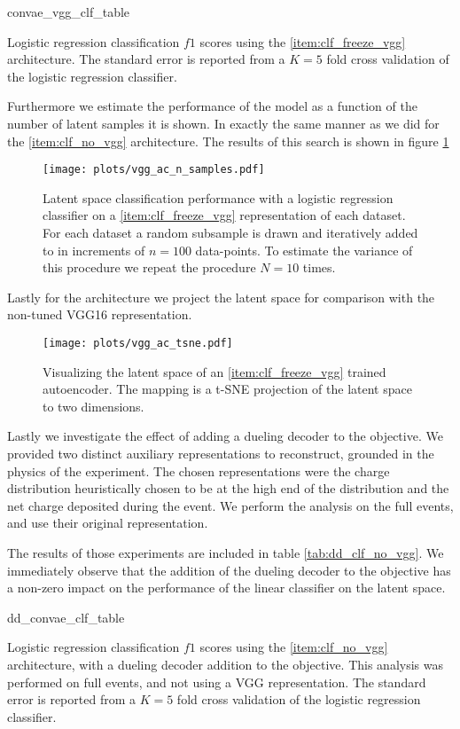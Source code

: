 \begin{table}
\centering
{convae_vgg_clf_table}
\caption{Logistic regression classification $f1$ scores using the \ref{item:clf_freeze_vgg} architecture. The standard error is reported from a $K=5$ fold cross validation of the logistic regression classifier.}\label{tab:clf_freeze_vgg}
\end{table}

\noindent Furthermore we estimate the performance of the model as a function of the number of latent samples it is shown. In exactly the same manner as we did for the \ref{item:clf_no_vgg} architecture. The results of this search is shown in figure \ref{fig:vgg_ac_n_labeled}

\begin{figure}
\centering
\texttt{[image: plots/vgg\_ac\_n\_samples.pdf]}
\caption[Autoencoder performance on labeled subsets]{Latent space classification performance with a logistic regression classifier on a \ref{item:clf_freeze_vgg} representation of each dataset. For each dataset a random subsample is drawn and iteratively added to in increments of $n=100$ data-points. To estimate the variance of this procedure we repeat the procedure $N=10$ times.}\label{fig:vgg_ac_n_labeled}
\end{figure}

Lastly for the architecture we project the latent space for comparison with the non-tuned VGG16 representation. 

\begin{figure}
\centering
\texttt{[image: plots/vgg\_ac\_tsne.pdf]}
\caption[VGG16-autoencoder latent space visualization]{Visualizing the latent space of an \ref{item:clf_freeze_vgg} trained autoencoder. The mapping is a t-SNE projection of the latent space to two dimensions.}\label{fig:ac_tnse}
\end{figure}

\noindent Lastly we investigate the effect of adding a dueling decoder to the objective. We provided two distinct auxiliary representations to reconstruct, grounded in the physics of the experiment. The chosen representations were the charge distribution heuristically chosen to be at the high end of the distribution and the net charge deposited during the event. We perform the analysis on the full events, and use their original representation. 

The results of those experiments are included in table \ref{tab:dd_clf_no_vgg}. We immediately observe that the addition of the dueling decoder to the objective has a non-zero impact on the performance of the linear classifier on the latent space.

\begin{table}
\centering
{dd_convae_clf_table}
\caption{Logistic regression classification $f1$ scores using the \ref{item:clf_no_vgg} architecture, with a dueling decoder addition to the objective. This analysis was performed on full events, and not using a VGG representation. The standard error is reported from a $K=5$ fold cross validation of the logistic regression classifier.}\label{tab:dd_clf_no_vgg}
\end{table}